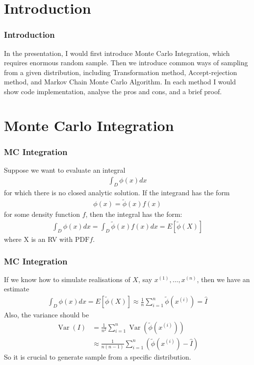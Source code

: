 \frame[plain]{\titlepage}

\section{Introduction}

\begin{frame}
    \frametitle{Introduction}
    
    In the presentation, I would first introduce Monte Carlo Integration, which requires enormous random sample. Then we introduce common ways of sampling from a given distribution, including Transformation method, Accept-rejection method, and Markov Chain Monte Carlo Algorithm. In each method I would show code implementation, analyse the pros and cons, and a brief proof.
    
\end{frame}
\section{Monte Carlo Integration}
\begin{frame}
    \frametitle{MC Integration}
    Suppose we want to evaluate an integral
    \begin{align*}
    \int_D \phi(x) d x
    \end{align*}
    for which there is no closed analytic solution. If the integrand has the form
    \begin{align*}
    \phi(x)=\tilde{\phi}(x) f(x)
    \end{align*}
    for some density function \(f\), then the integral has the form:
    \begin{align*}
    \int_D \phi(x) d x=\int_D \tilde{\phi}(x) f(x) d x=E[\tilde{\phi}(X)]
    \end{align*}
    where \(\mathrm{X}\) is an RV with \(\mathrm{PDF} f\). 

    

\end{frame}
\begin{frame}
    \frametitle{MC Integration}
    If we know how to simulate realisations of \(X\), say \(x^{(1)}, \ldots, x^{(n)}\), then we have an estimate
    \begin{align*}
    \int_D \phi(x) d x=E[\tilde{\phi}(X)] \approx \frac{1}{n} \sum_{i=1}^n \tilde{\phi}\left(x^{(i)}\right)=\hat{I}
    \end{align*}
    Also, the variance should be
    \begin{align*}
        \operatorname{Var}(I) &= \frac{1}{n^2} \sum_{i=1}^n \operatorname{Var}\left(\tilde{\phi}\left(x^{(i)}\right)\right) \\
        &\approx \frac{1}{n(n-1)} \sum_{i=1}^n \left(\tilde{\phi}\left(x^{(i)}\right) - \hat I\right)
    \end{align*}
    So it is crucial to generate sample from a specific distribution.

    

\end{frame}
